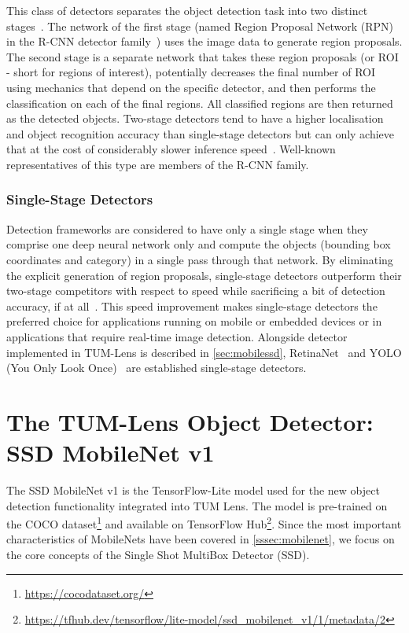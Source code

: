 \documentclass[
			   fontsize=11pt,
               paper=a4,
               bibliography=totoc,
               idxtotoc,
               headsepline,
               footsepline,
               footinclude=false,
               BCOR=12mm,
               DIV=13,
               openany,   %
               oneside    %
               ]
               {scrbook}
\begin{document}
This class of detectors separates the object detection task into two distinct stages~\cite{12stageSYNASC2018}. The network of the first stage (named Region Proposal Network (RPN) in the R-CNN detector family~\cite{detectorRCNN}) uses the image data to generate region proposals. The second stage is a separate network that takes these region proposals (or ROI - short for regions of interest), potentially decreases the final number of ROI using mechanics that depend on the specific detector, and then performs the classification on each of the final regions. All classified regions are then returned as the detected objects. Two-stage detectors tend to have a higher localisation and object recognition accuracy than single-stage detectors but can only achieve that at the cost of considerably slower inference speed~\cite{surveyICBDT2019}. Well-known representatives of this type are members of the R-CNN family.

\subsubsection{Single-Stage Detectors}

Detection frameworks are considered to have only a single stage when they comprise one deep neural network only and compute the objects (bounding box coordinates and category) in a single pass through that network. By eliminating the explicit generation of region proposals, single-stage detectors outperform their two-stage competitors with respect to speed while sacrificing a bit of detection accuracy, if at all~\cite{detectorSSD}. 
This speed improvement makes single-stage detectors the preferred choice for applications running on mobile or embedded devices or in applications that require real-time image detection. Alongside detector implemented in TUM-Lens is described in \autoref{sec:mobilessd}, RetinaNet~\cite{detectorRetinaNet} and YOLO (You Only Look Once)~\cite{detectorYOLOv4} are established single-stage detectors.


\section{The TUM-Lens Object Detector: SSD MobileNet v1} \label{sec:mobilessd}

The SSD MobileNet v1 is the TensorFlow-Lite model used for the new object detection functionality integrated into TUM Lens. The model is pre-trained on the COCO dataset\footnote{\url{https://cocodataset.org/}} and available on TensorFlow Hub\footnote{\url{https://tfhub.dev/tensorflow/lite-model/ssd_mobilenet_v1/1/metadata/2}}. Since the most important characteristics of MobileNets have been covered in \autoref{sssec:mobilenet}, we focus on the core concepts of the Single Shot MultiBox Detector (SSD).
\end{document}
